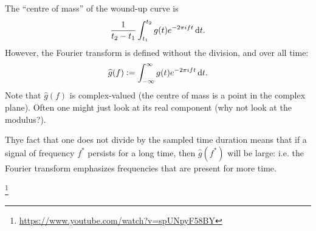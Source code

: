 The ``centre of mass'' of the wound-up curve is
\begin{align*}
  \frac{1}{t_2 - t_1} \int_{t_1}^{t_2} g(t)e^{-2\pi i f t} \dt.
\end{align*}
However, the Fourier transform is defined without the division, and over all time:
\begin{align*}
  \hat{g}(f) := \int_{-\infty}^{\infty} g(t)e^{-2\pi i f t} \dt.
\end{align*}
Note that $\hat{g}(f)$ is complex-valued (the centre of mass is a point in the complex plane). Often one might
just look at its real component (why not look at the modulus?).

Thye fact that one does not divide by the sampled time duration means that if a signal of frequency $f^*$
persists for a long time, then $\hat{g}(f^*)$ will be large: i.e. the Fourier transform emphasizes frequencies
that are present for more time.

\footnote{\url{https://www.youtube.com/watch?v=spUNpyF58BY}}

